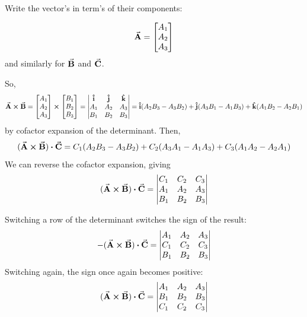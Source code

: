 \documentclass[a4paper]{article}
\begin{document}
Write the vector's in term's of their components:

$$ \va{A} = \begin{bmatrix}
    A_1 \\
    A_2 \\
    A_3 \\
\end{bmatrix} $$
and similarly for $\va{B}$ and $\va{C}$.

So,
$$ \va{A} \cross \va{B} = \begin{bmatrix}
    A_1 \\
    A_2 \\
    A_3 \\
\end{bmatrix} \cross
\begin{bmatrix}
    B_1 \\
    B_2 \\
    B_3 \\
\end{bmatrix} = \begin{vmatrix}
    \vu{i} & \vu{j} & \vu{k} \\
    A_1 & A_2 & A_3 \\
    B_1 & B_2 & B_3 \\
    \end{vmatrix} = \vu{i}(A_2 B_3 - A_3 B_2) + \vu{j}(A_3 B_1 - A_1 B_3) + \vu{k}(A_1 B_2 - A_2 B_1) $$
by cofactor expansion of the determinant.
Then, 
$$(\va{A} \cross \va{B}) \vdot \va{C} = C_1 (A_2 B_3 - A_3 B_2) + C_2 (A_3 A_1 - A_1 A_3) + C_3 (A_1 A_2 - A_2 A_1)$$
We can reverse the cofactor expansion, giving
$$ (\va{A} \cross \va{B}) \vdot \va{C} = 
    \begin{vmatrix}
    C_1 & C_2 & C_3 \\
    A_1 & A_2 & A_3 \\
    B_1 & B_2 & B_3 \\
    \end{vmatrix}$$

Switching a row of the determinant switches the sign of the result:
$$ -(\va{A} \cross \va{B}) \vdot \va{C} = 
    \begin{vmatrix}
    A_1 & A_2 & A_3 \\
    C_1 & C_2 & C_3 \\
    B_1 & B_2 & B_3 \\
    \end{vmatrix}$$
Switching again, the sign once again becomes positive:
$$ (\va{A} \cross \va{B}) \vdot \va{C} = 
    \begin{vmatrix}
    A_1 & A_2 & A_3 \\
    B_1 & B_2 & B_3 \\
    C_1 & C_2 & C_3 
    \end{vmatrix}  $$ \\\\
\end{document}
